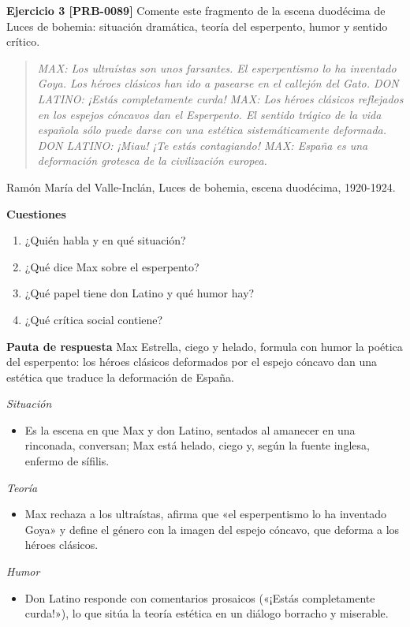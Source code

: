 \documentclass{book}
\begin{document}
\noindent\textbf{Ejercicio 3 [PRB-0089]}
Comente este fragmento de la escena duodécima de Luces de bohemia: situación dramática, teoría del esperpento, humor y sentido crítico.


\begin{quote}
\itshape MAX: Los ultraístas son unos farsantes. El esperpentismo lo ha inventado Goya. Los héroes clásicos han ido a pasearse en el callejón del Gato. DON LATINO: ¡Estás completamente curda! MAX: Los héroes clásicos reflejados en los espejos cóncavos dan el Esperpento. El sentido trágico de la vida española sólo puede darse con una estética sistemáticamente deformada. DON LATINO: ¡Miau! ¡Te estás contagiando! MAX: España es una deformación grotesca de la civilización europea.
\end{quote}
{\noindent\footnotesize Ramón María del Valle-Inclán, Luces de bohemia, escena duodécima, 1920-1924.\par}

\noindent\textbf{Cuestiones}
\begin{enumerate}
\item ¿Quién habla y en qué situación?
\item ¿Qué dice Max sobre el esperpento?
\item ¿Qué papel tiene don Latino y qué humor hay?
\item ¿Qué crítica social contiene?
\end{enumerate}

\noindent\textbf{Pauta de respuesta}
Max Estrella, ciego y helado, formula con humor la poética del esperpento: los héroes clásicos deformados por el espejo cóncavo dan una estética que traduce la deformación de España.


\noindent\textit{Situación}
\begin{itemize}
\item Es la escena en que Max y don Latino, sentados al amanecer en una rinconada, conversan; Max está helado, ciego y, según la fuente inglesa, enfermo de sífilis.
\end{itemize}

\noindent\textit{Teoría}
\begin{itemize}
\item Max rechaza a los ultraístas, afirma que «el esperpentismo lo ha inventado Goya» y define el género con la imagen del espejo cóncavo, que deforma a los héroes clásicos.
\end{itemize}

\noindent\textit{Humor}
\begin{itemize}
\item Don Latino responde con comentarios prosaicos («¡Estás completamente curda!»), lo que sitúa la teoría estética en un diálogo borracho y miserable.
\end{itemize}
\end{document}
